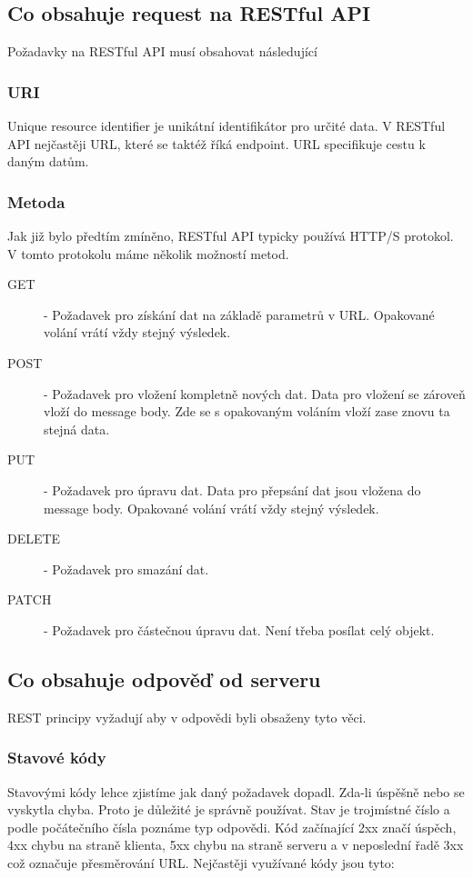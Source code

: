 \subsection{Co obsahuje request na RESTful API} %
Požadavky na RESTful API musí obsahovat následující
\subsubsection{URI}
Unique resource identifier je unikátní identifikátor pro určité data. V RESTful API nejčastěji URL, které se taktéž říká endpoint. URL specifikuje cestu k daným datům.
\subsubsection{Metoda}
Jak již bylo předtím zmíněno, RESTful API typicky používá HTTP/S protokol. V tomto protokolu máme několik možností metod.

\begin{description}
    \item[GET] - Požadavek pro získání dat na základě parametrů v URL. Opakované volání vrátí vždy stejný výsledek.
    \item[POST] - Požadavek pro vložení kompletně nových dat. Data pro vložení se zároveň vloží do message body. Zde se s opakovaným voláním vloží zase znovu ta stejná data.
    \item[PUT] - Požadavek pro úpravu dat. Data pro přepsání dat jsou vložena do message body. Opakované volání vrátí vždy stejný výsledek.
    \item[DELETE] - Požadavek pro smazání dat.
    \item[PATCH] - Požadavek pro částečnou úpravu dat. Není třeba posílat celý objekt.
\end{description}

\subsection{Co obsahuje odpověď od serveru}
REST principy vyžadují aby v odpovědi byli obsaženy tyto věci.
\subsubsection{Stavové kódy}
Stavovými kódy lehce zjistíme jak daný požadavek dopadl. Zda-li úspěšně nebo se vyskytla chyba. Proto je důležité je správně používat. Stav je trojmístné číslo a podle počátečního čísla poznáme typ odpovědi. Kód začínající 2xx značí úspěch, 4xx chybu na straně klienta, 5xx chybu na straně serveru a v neposlední řadě 3xx což označuje přesměrování URL.
Nejčastěji využívané kódy jsou tyto:

